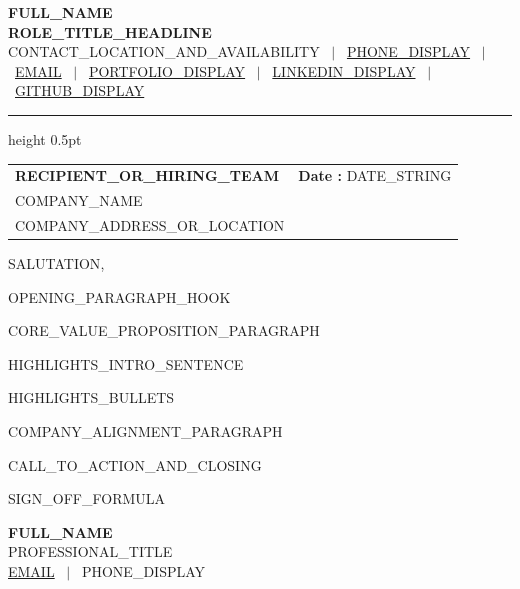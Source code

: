 \documentclass[letterpaper,10pt]{article}
\begin{document}
\begin{center}
    {\LARGE \textbf{\scshape {{FULL_NAME}}}} \\ \vspace{2pt}
    {\small \textbf{\color{NavyBlue} {{ROLE_TITLE_HEADLINE}}}} \\ \vspace{2pt}
    \footnotesize 
    {{CONTACT_LOCATION_AND_AVAILABILITY}} \ $|$ \ 
    \href{tel:{{PHONE_RAW}}}{{{PHONE_DISPLAY}}} \ $|$ \ 
    \href{mailto:{{EMAIL}}}{{{EMAIL}}} \ $|$ \ 
    \href{{{PORTFOLIO_URL}}}{{{PORTFOLIO_DISPLAY}}} \ $|$ \ 
    \href{{{LINKEDIN_URL}}}{{{LINKEDIN_DISPLAY}}} \ $|$ \ 
    \href{{{GITHUB_URL}}}{{{GITHUB_DISPLAY}}}
\end{center}

\vspace{-4pt}
\hrule height 0.5pt \relax
\vspace{10pt}

\begin{tabularx}{\linewidth}{X r}
  \textbf{{{RECIPIENT_OR_HIRING_TEAM}}} & \textbf{Date :} {{DATE_STRING}} \\
  {{COMPANY_NAME}} & \\
  {{COMPANY_ADDRESS_OR_LOCATION}} & \\
\end{tabularx}

\vspace{10pt}

\textbf{}

\vspace{8pt}

{{SALUTATION}},

\vspace{5pt}
{{OPENING_PARAGRAPH_HOOK}}

\vspace{5pt}
{{CORE_VALUE_PROPOSITION_PARAGRAPH}}

\vspace{5pt}
{{HIGHLIGHTS_INTRO_SENTENCE}}
\begin{itemize}[leftmargin=0.15in, itemsep=1.5pt, topsep=2pt, parsep=0pt]
{{HIGHLIGHTS_BULLETS}}
\end{itemize}

\vspace{5pt}
{{COMPANY_ALIGNMENT_PARAGRAPH}}

\vspace{5pt}
{{CALL_TO_ACTION_AND_CLOSING}}

\vspace{12pt}

{{SIGN_OFF_FORMULA}}

\vspace{4pt}
\textbf{{{FULL_NAME}}} \\
\small{{{PROFESSIONAL_TITLE}}} \\
\footnotesize{\href{mailto:{{EMAIL}}}{{{EMAIL}}} \ $|$ \ {{PHONE_DISPLAY}}}
\end{document}
